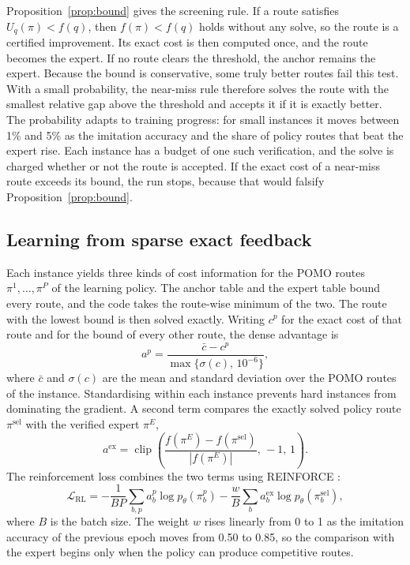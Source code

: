 \documentclass[preprint,12pt,authoryear]{elsarticle}
\begin{document}
Proposition~\ref{prop:bound} gives the screening rule. If a route satisfies $U_{q}(\pi) < f(q)$, then $f(\pi) < f(q)$ holds without any solve, so the route is a certified improvement. Its exact cost is then computed once, and the route becomes the expert. If no route clears the threshold, the anchor remains the expert. Because the bound is conservative, some truly better routes fail this test. With a small probability, the near-miss rule therefore solves the route with the smallest relative gap above the threshold and accepts it if it is exactly better. The probability adapts to training progress: for small instances it moves between 1\% and 5\% as the imitation accuracy and the share of policy routes that beat the expert rise. Each instance has a budget of one such verification, and the solve is charged whether or not the route is accepted. If the exact cost of a near-miss route exceeds its bound, the run stops, because that would falsify Proposition~\ref{prop:bound}.

\subsection{Learning from sparse exact feedback}

Each instance yields three kinds of cost information for the POMO routes $\pi^{1},\dots,\pi^{P}$ of the learning policy. The anchor table and the expert table bound every route, and the code takes the route-wise minimum of the two. The route with the lowest bound is then solved exactly. Writing $c^{p}$ for the exact cost of that route and for the bound of every other route, the dense advantage is
\begin{equation}
a^{p} = \frac{\bar{c} - c^{p}}{\max\{\sigma(c),\, 10^{-6}\}},
\end{equation}
where $\bar{c}$ and $\sigma(c)$ are the mean and standard deviation over the POMO routes of the instance. Standardising within each instance prevents hard instances from dominating the gradient. A second term compares the exactly solved policy route $\pi^{\mathrm{sel}}$ with the verified expert $\pi^{E}$,
\begin{equation}
a^{\mathrm{ex}} = \operatorname{clip}\!\left(\frac{f(\pi^{E}) - f(\pi^{\mathrm{sel}})}{|f(\pi^{E})|},\, -1,\, 1\right).
\end{equation}
The reinforcement loss combines the two terms using REINFORCE \citep{williams1992}:
\begin{equation}
\mathcal{L}_{\mathrm{RL}} = -\frac{1}{BP}\sum_{b,p} a^{p}_{b} \log p_{\theta}(\pi^{p}_{b}) - \frac{w}{B} \sum_{b} a^{\mathrm{ex}}_{b} \log p_{\theta}(\pi^{\mathrm{sel}}_{b}),
\end{equation}
where $B$ is the batch size. The weight $w$ rises linearly from 0 to 1 as the imitation accuracy of the previous epoch moves from 0.50 to 0.85, so the comparison with the expert begins only when the policy can produce competitive routes.
\end{document}
